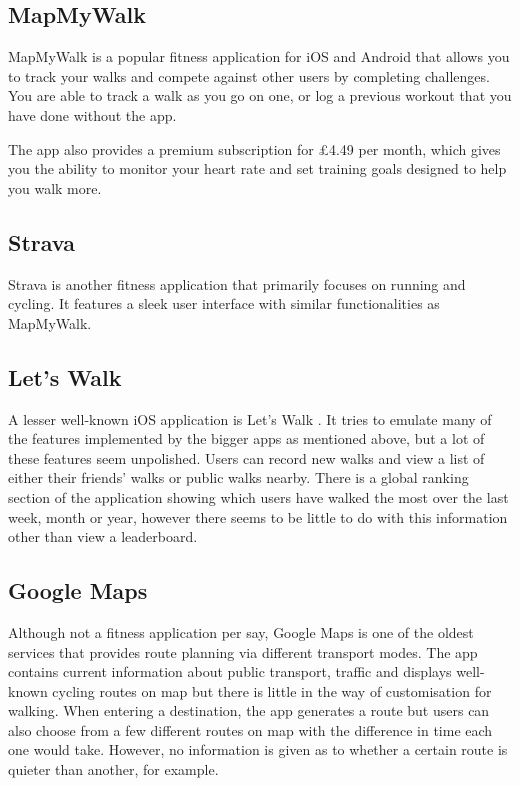 
\subsection{MapMyWalk}

MapMyWalk \cite{Map} is a popular fitness application for iOS and Android that allows you to track your walks and compete against other users by completing challenges. You are able to track a walk as you go on one, or log a previous workout that you have done without the app.

The app also provides a premium subscription for \pounds4.49 per month, which gives you the ability to monitor your heart rate and set training goals designed to help you walk more.

\subsection{Strava}

Strava \cite{StravaInc.} is another fitness application that primarily focuses on running and cycling. It features a sleek user interface with similar functionalities as MapMyWalk.

\subsection{Let's Walk}

A lesser well-known iOS application is Let's Walk \cite{LetsWalkApp}. It tries to emulate many of the features implemented by the bigger apps as mentioned above, but a lot of these features seem unpolished. Users can record new walks and view a list of either their friends' walks or public walks nearby. There is a global ranking section of the application showing which users have walked the most over the last week, month or year, however there seems to be little to do with this information other than view a leaderboard.

\subsection{Google Maps}

Although not a fitness application per say, Google Maps \cite{GoogleInc.} is one of the oldest services that provides route planning via different transport modes. The app contains current information about public transport, traffic and displays well-known cycling routes on map but there is little in the way of customisation for walking. When entering a destination, the app generates a route but users can also choose from a few different routes on map with the difference in time each one would take. However, no information is given as to whether a certain route is quieter than another, for example.

